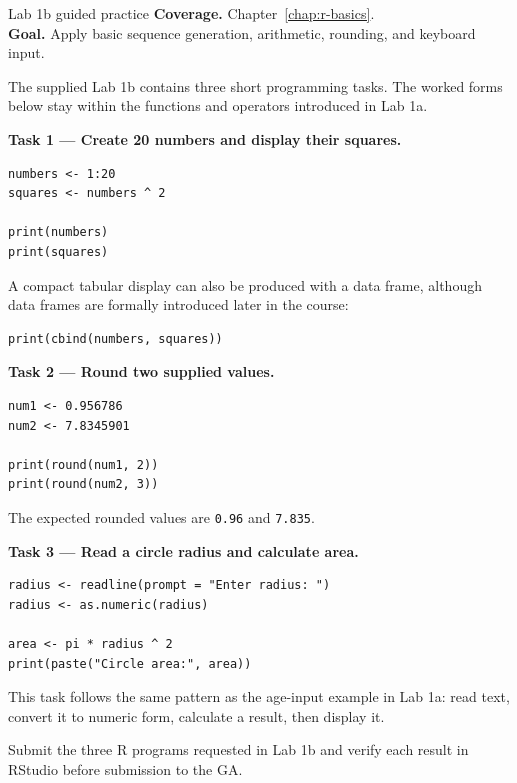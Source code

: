 
\begin{labproject}{Lab 1b guided practice}
\textbf{Coverage.} Chapter~\ref{chap:r-basics}.\\
\textbf{Goal.} Apply basic sequence generation, arithmetic, rounding, and keyboard input.

\begin{labmode}
The supplied Lab 1b contains three short programming tasks. The worked forms below stay within the functions and operators introduced in Lab 1a.
\end{labmode}

\textbf{Task 1 --- Create 20 numbers and display their squares.}

\begin{lstlisting}[style=dsr]
numbers <- 1:20
squares <- numbers ^ 2

print(numbers)
print(squares)
\end{lstlisting}

A compact tabular display can also be produced with a data frame, although data frames are formally introduced later in the course:

\begin{lstlisting}[style=dsr]
print(cbind(numbers, squares))
\end{lstlisting}

\textbf{Task 2 --- Round two supplied values.}

\begin{lstlisting}[style=dsr]
num1 <- 0.956786
num2 <- 7.8345901

print(round(num1, 2))
print(round(num2, 3))
\end{lstlisting}

The expected rounded values are \texttt{0.96} and \texttt{7.835}.

\textbf{Task 3 --- Read a circle radius and calculate area.}

\begin{lstlisting}[style=dsr]
radius <- readline(prompt = "Enter radius: ")
radius <- as.numeric(radius)

area <- pi * radius ^ 2
print(paste("Circle area:", area))
\end{lstlisting}

This task follows the same pattern as the age-input example in Lab 1a: read text, convert it to numeric form, calculate a result, then display it.
\end{labproject}

\begin{labdeliverable}
Submit the three R programs requested in Lab 1b and verify each result in RStudio before submission to the GA.
\end{labdeliverable}
